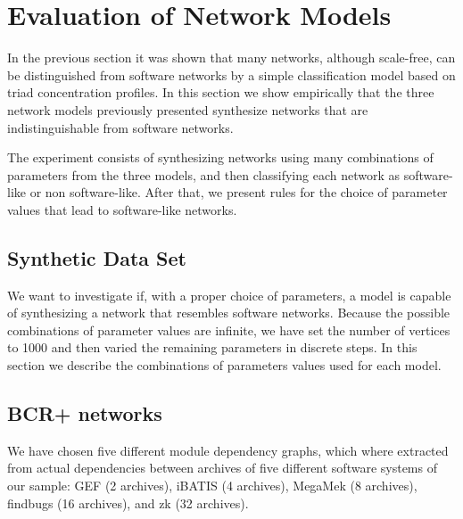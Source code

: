 

\section{Evaluation of Network Models}

In the previous section it was shown that many networks, although scale-free,
can be distinguished from software networks by a simple classification model
based on triad concentration profiles. In this section we show empirically that
the three network models previously presented synthesize networks that are
indistinguishable from software networks.

The experiment consists of synthesizing networks using many combinations of
parameters from the three models, and then classifying each network as
software-like or non software-like. After that, we present rules for the choice
of parameter values that lead to software-like networks.

\subsection{Synthetic Data Set}

We want to investigate if, with a proper choice of parameters, a model is
capable of synthesizing a network that resembles software networks. Because the
possible combinations of parameter values are infinite, we have set the number
of vertices to 1000 and then varied the remaining parameters in discrete steps.
In this section we describe the combinations of parameters values used for each
model.

\subsection{BCR+ networks}

We have chosen five different module dependency graphs, which where extracted
from actual dependencies between archives of five different software systems of
our sample: GEF (2 archives), iBATIS (4 archives), MegaMek (8 archives),
findbugs (16 archives), and zk (32 archives). 

